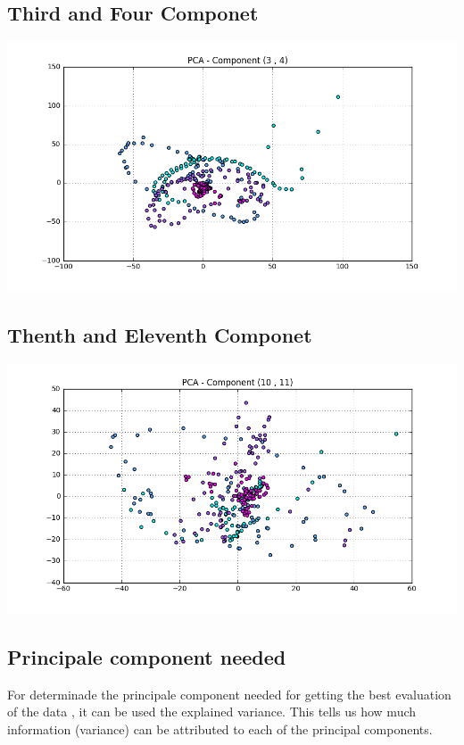 \documentclass[11pt]{article}
\begin{document}
\subsection{Third and Four Componet}
\begin{center}
 \includegraphics[scale=0.5]{2}
\end{center}

\subsection{Thenth and Eleventh Componet}
\begin{center}
 \includegraphics[scale=0.5]{3}
\end{center}



\subsection{Principale component needed}
For determinade the principale component needed for getting the best evaluation of the data , it can be used the explained variance. This tells us how much information (variance) can be attributed to each of the principal components.
\end{document}
